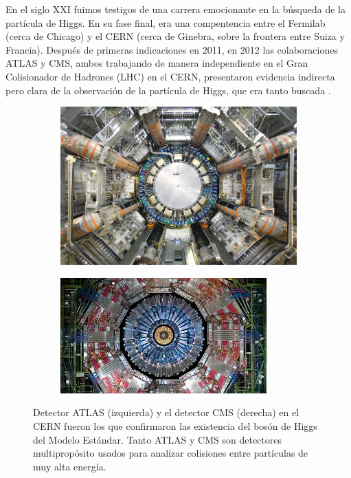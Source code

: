 En el siglo XXI fuimos testigos de una carrera emocionante en la
b\'usqueda de la part\'icula de Higgs. En su fase final, era una
compentencia entre el Fermilab (cerca de Chicago) y el CERN
(cerca de Ginebra, sobre la frontera entre Suiza y Francia).
Despu\'es de primeras indicaciones en 2011, en 2012 las
colaboraciones ATLAS y CMS, ambos trabajando de manera independiente
en el Gran Colisionador de Hadrones (LHC) en el CERN, presentaron
evidencia indirecta pero clara de la observaci\'on de la
part\'icula de Higgs, que era tanto buscada \cite{ATLASCMS}.

	
\begin{figure}

\begin{subfigure}{0.5\textwidth}
	\includegraphics[scale=0.27]{images/atlas.jpg}
\end{subfigure}	
\begin{subfigure}{0.5\textwidth}
	\includegraphics[scale=0.9]{images/cms.jpeg}
\end{subfigure}	
\caption{Detector ATLAS (izquierda) y el detector CMS (derecha) en el CERN fueron los que confirmaron las existencia del bos\'on de Higgs del Modelo Est\'andar. Tanto ATLAS y CMS son detectores multiprop\'osito usados para analizar colisiones entre part\'iculas de muy alta energ\'ia.}
\end{figure}


